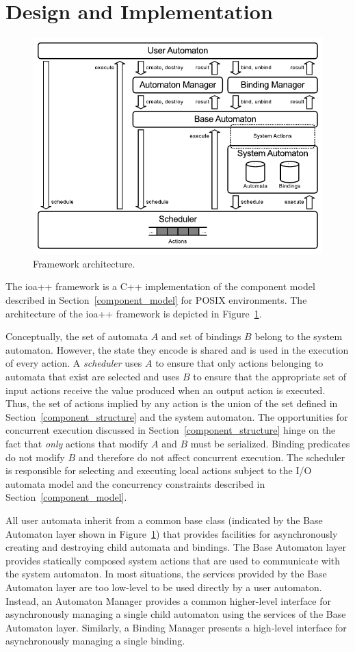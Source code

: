 \section{Design and Implementation\label{design}}

\begin{figure}
\center
\includegraphics[width=.6\columnwidth]{architecture}
\caption{Framework architecture.}
\label{framework_architecture}
\end{figure}

The ioa++ framework is a C++ implementation of the component model described in Section~\ref{component_model} for POSIX environments.
The architecture of the ioa++ framework is depicted in Figure~\ref{framework_architecture}.

Conceptually, the set of automata $A$ and set of bindings $B$ belong to the system automaton.
However, the state they encode is shared and is used in the execution of every action.
A \emph{scheduler} uses $A$ to ensure that only actions belonging to automata that exist are selected and uses $B$ to ensure that the appropriate set of input actions receive the value produced when an output action is executed.
Thus, the set of actions implied by any action is the union of the set defined in Section~\ref{component_structure} and the system automaton.
The opportunities for concurrent execution discussed in Section~\ref{component_structure} hinge on the fact that \emph{only} actions that modify $A$ and $B$ must be serialized.
Binding predicates do not modify $B$ and therefore do not affect concurrent execution.
The scheduler is responsible for selecting and executing local actions subject to the I/O automata model and the concurrency constraints described in Section~\ref{component_model}.

All user automata inherit from a common base class (indicated by the Base Automaton layer shown in Figure~\ref{framework_architecture}) that provides facilities for asynchronously creating and destroying child automata and bindings.
The Base Automaton layer provides statically composed system actions that are used to communicate with the system automaton.
In most situations, the services provided by the Base Automaton layer are too low-level to be used directly by a user automaton.
Instead, an Automaton Manager provides a common higher-level interface for asynchronously managing a single child automaton using the services of the Base Automaton layer.
Similarly, a Binding Manager presents a high-level interface for asynchronously managing a single binding.

